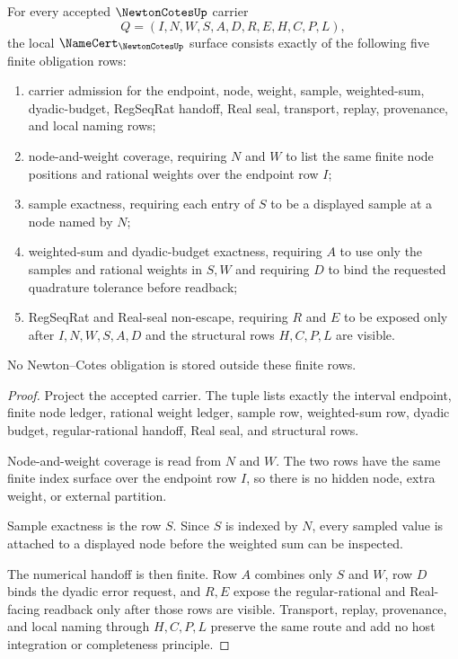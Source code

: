 \begin{theorem}
\label{thm:newton-cotes-namecert-obligations}
For every accepted $\NewtonCotesUp$ carrier
$$
Q=(I,N,W,S,A,D,R,E,H,C,P,L),
$$
the local $\NameCert_{\NewtonCotesUp}$ surface consists exactly of the following five finite obligation rows:
\begin{enumerate}
\item carrier admission for the endpoint, node, weight, sample, weighted-sum, dyadic-budget, RegSeqRat handoff, Real seal, transport, replay, provenance, and local naming rows;
\item node-and-weight coverage, requiring $N$ and $W$ to list the same finite node positions and rational weights over the endpoint row $I$;
\item sample exactness, requiring each entry of $S$ to be a displayed sample at a node named by $N$;
\item weighted-sum and dyadic-budget exactness, requiring $A$ to use only the samples and rational weights in $S,W$ and requiring $D$ to bind the requested quadrature tolerance before readback;
\item RegSeqRat and Real-seal non-escape, requiring $R$ and $E$ to be exposed only after $I,N,W,S,A,D$ and the structural rows $H,C,P,L$ are visible.
\end{enumerate}
No Newton--Cotes obligation is stored outside these finite rows.
\end{theorem}
\begin{proof}
Project the accepted carrier. The tuple lists exactly the interval endpoint, finite node ledger, rational weight ledger, sample row, weighted-sum row, dyadic budget, regular-rational handoff, Real seal, and structural rows.

Node-and-weight coverage is read from $N$ and $W$. The two rows have the same finite index surface over the endpoint row $I$, so there is no hidden node, extra weight, or external partition.

Sample exactness is the row $S$. Since $S$ is indexed by $N$, every sampled value is attached to a displayed node before the weighted sum can be inspected.

The numerical handoff is then finite. Row $A$ combines only $S$ and $W$, row $D$ binds the dyadic error request, and $R,E$ expose the regular-rational and Real-facing readback only after those rows are visible. Transport, replay, provenance, and local naming through $H,C,P,L$ preserve the same route and add no host integration or completeness principle.
\end{proof}

